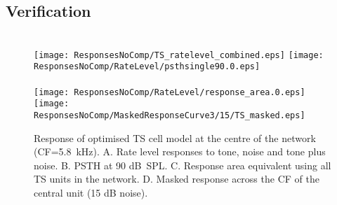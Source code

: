 \subsection{Verification}


\begin{figure}[htb]
\centering
\hspace{0.5cm}\hspace{0.5\textwidth}\hfill\\
\texttt{[image: ResponsesNoComp/TS\_ratelevel\_combined.eps]}\hfill%
\texttt{[image: ResponsesNoComp/RateLevel/psthsingle90.0.eps]}\\
\hspace{0.5cm}\hspace{0.5\textwidth}\hfill\\
\texttt{[image: ResponsesNoComp/RateLevel/response\_area.0.eps]}\hfill%
\texttt{[image: ResponsesNoComp/MaskedResponseCurve3/15/TS\_masked.eps]}\\
\caption[Optimised TS cell model responses]{Response of optimised TS cell model at the centre of the network (CF=5.8~kHz). A. Rate level responses to tone, noise and tone plus noise. B. PSTH at 90 dB~SPL.  C. Response area equivalent using all TS units in the network. D. Masked response across the CF of the central unit (15 dB noise).} \label{fig:TS_verification}
\end{figure}







